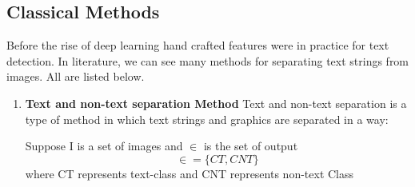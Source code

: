 \subsection{Classical Methods}
Before the rise of deep learning hand crafted features were in practice for text detection. In literature, we can see many methods for separating text strings from images. All are listed below.
\begin{enumerate}
    \item \textbf{Text and non-text separation Method} \newline
    Text and non-text separation \cite{offline} is a type of method in which text strings and graphics are separated in a way:
    
    Suppose I is a set of images and $ \in $ is the set of output 
    \begin{equation}
    \label{eqn:Text and non-text separation Method}
    \in = \{ CT , CNT \}
    \end{equation}
    where CT represents text-class and CNT represents non-text Class


\end{enumerate}
